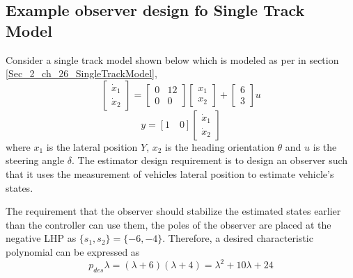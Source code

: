 \subsection{Example observer design fo Single Track Model} \label{Sec_2_ch_26_ObserverDesignSingleTrackModel}

Consider a single track model shown below which is modeled as per in section \ref{Sec_2_ch_26_SingleTrackModel},
\begin{equation}
	\begin{bmatrix}
	\dot{x}_{1} \\ \dot{x}_{2}
	\end{bmatrix} = \begin{bmatrix}
	0 & 12 \\ 0 & 0
	\end{bmatrix}\begin{bmatrix}
	{x}_{1} \\ {x}_{2}
	\end{bmatrix} + \begin{bmatrix}
	6 \\ 3
	\end{bmatrix}u
\end{equation}
\begin{equation}
	y = [1 \quad 0] \begin{bmatrix}
	\dot{x}_{1} \\ \dot{x}_{2}
	\end{bmatrix}
\end{equation}
where $x_{1}$ is the lateral position $Y$, $x_2$ is the heading orientation $\theta$ and $u$ is the steering angle $\delta$. The estimator design requirement is to design an observer such that it uses the measurement of vehicles lateral position to estimate vehicle's states. 

The requirement that the observer should stabilize the estimated states earlier than the controller can use them, the poles of the observer are placed at the negative LHP as $\{s_1, s_2\} = \{-6,-4\}$. Therefore, a desired characteristic polynomial can be expressed as
\begin{equation}\label{Eq_2_ch_26_ExObserverDesign2_1}
	p_{des}\lambda = (\lambda + 6)(\lambda + 4) = \lambda^{2} + 10 \lambda + 24
\end{equation}

